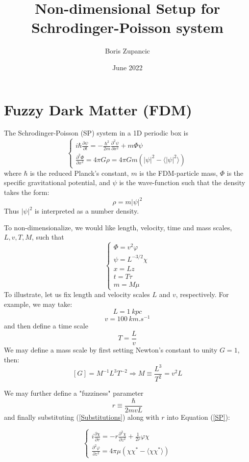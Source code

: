 \documentclass{article}
\title{Non-dimensional Setup for Schrodinger-Poisson system}
\author{Boris Zupancic}
\date{June 2022}
\newcommand{\pd}{\partial}
\begin{document}
\maketitle

\section{Fuzzy Dark Matter (FDM)}
The Schrodinger-Poisson (SP) system in a 1D periodic box is
\begin{equation}
    \begin{cases}
    i\hbar \frac{\pd \psi}{\pd t} = -\frac{\hbar^2}{2m}\frac{\pd^2 \psi}{\pd x^2} + m\Phi \psi 
    \\
    \frac{\pd^2 \Phi}{\pd x^2} = 4\pi G \rho= 4\pi G m (|\psi|^2 - \langle |\psi|^2 \rangle)
    \end{cases}
    \label{SP}
\end{equation}
where $\hbar$ is the reduced Planck's constant, $m$ is the FDM-particle mass, $\Phi$ is the specific gravitational potential, and $\psi$ is the wave-function such that the density takes the form:
$$\rho = m|\psi|^2$$
Thus $|\psi|^2$ is interpreted as a number density.

To non-dimensionalize, we would like length, velocity, time and mass scales, $L, v,T,M$, such that
\begin{equation}
    \begin{cases}
    \Phi = v^2 \varphi\\
    \psi = L^{-3/2} \chi\\
    x = L z\\
    t = T \tau\\
    m = M \mu
    \end{cases}
    \label{Substitutions}
\end{equation}
To illustrate, let us fix length and velocity scales $L$ and $v$, respectively. For example, we may take:
$$L = \SI{1}{kpc} $$
$$v = \SI{100}{km.s^{-1}}$$
and then define a time scale 
$$T  = \frac{L}{v}$$
We may define a mass scale by first setting Newton's constant to unity $G = 1$, then:
$$[G] = M^{-1} L^3 T^{-2} \Rightarrow M \equiv \frac{L^3}{T^2} = v^2 L$$

We may further define a "fuzziness" parameter 
$$r \equiv \frac{\hbar}{2 m v L}$$
and finally substituting (\ref{Substitutions}) along with $r$ into Equation (\ref{SP}):

\begin{equation}
    \begin{cases}
    i\frac{\pd \chi}{\pd \tau} = -r\frac{\pd^2 \chi}{\pd z^2} + \frac{1}{2r}\varphi\chi \\
    
    \frac{\pd^2 \varphi}{\pd z^2} = 4\pi\mu (\chi\chi^* - \langle\chi\chi^*\rangle)
    \end{cases}
    \label{SP-NonDim}
\end{equation}
\end{document}
